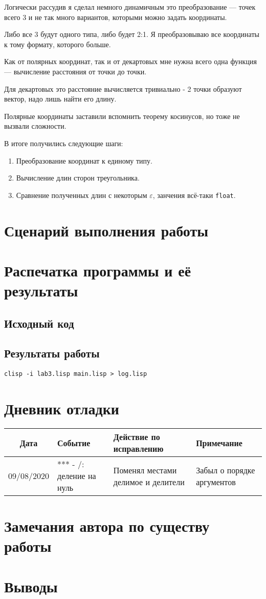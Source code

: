 \documentclass[12pt]{article}
\begin{document}
Логически рассудив я сделал немного динамичным это преобразование ---
точек всего 3 и не так много вариантов, которыми можно задать координаты.

Либо все 3 будут одного типа, либо будет 2:1. Я преобразовываю все координаты к
тому формату, которого больше.

\smallbreak

Как от полярных координат, так и от декартовых мне нужна всего одна функция ---
вычисление расстояния от точки до точки.

Для декартовых это расстояние вычисляется тривиально - 2 точки образуют вектор,
надо лишь найти его длину.

Полярные координаты заставили вспомнить теорему косинусов,
но тоже не вызвали сложности.

В итоге получились следующие шаги:
\begin{enumerate}
  \item Преобразование координат к единому типу.
  \item Вычисление длин сторон треугольника.
  \item Сравнение полученных длин с некоторым $\varepsilon$, занчения всё-таки {\tt float}.
\end{enumerate}

\section{Сценарий выполнения работы}
\section{Распечатка программы и её результаты}

\subsection{Исходный код}

\subsection{Результаты работы}
\lstinline{clisp -i lab3.lisp main.lisp > log.lisp}

\section{Дневник отладки}
\noindent
\begin{tabularx}{\linewidth}{|c|X|X|X|}
\hline
Дата & Событие & Действие по исправлению & Примечание \\
\hline
09/08/2020 & *** - /: деление на нуль & Поменял местами делимое и делители & Забыл о порядке аргументов \\
\hline
\end{tabularx}

\section{Замечания автора по существу работы}

\section{Выводы}
\end{document}
